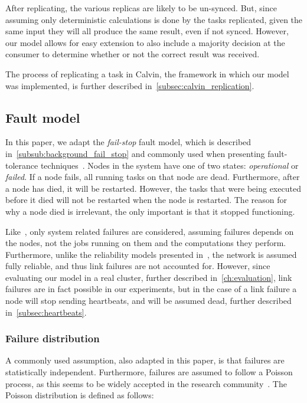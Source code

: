 \documentclass{cslthse-msc}
\begin{document}
After replicating, the various replicas are likely to be un-synced. But, since assuming only deterministic calculations is done by the tasks replicated, given the same input they will all produce the same result, even if not synced. However, our model allows for easy extension to also include a majority decision at the consumer to determine whether or not the correct result was received. %

The process of replicating a task in Calvin, the framework in which our model was implemented, is further described in~\cref{subsec:calvin_replication}.

\subsection{Fault model} \label{subsec:design_fault_model}
In this paper, we adapt the \emph{fail-stop} fault model, which is described in~\cref{subsub:background_fail_stop} and commonly used when presenting fault-tolerance techniques~\cite{surveyFaultParallel}. Nodes in the system have one of two states: \emph{operational} or \emph{failed}. If a node fails, all running tasks on that node are dead. Furthermore, after a node has died, it will be restarted. However, the tasks that were being executed before it died will not be restarted when the node is restarted. The reason for why a node died is irrelevant, the only important is that it stopped functioning.

Like~\cite{selfAdaptRel}, only system related failures are considered, assuming failures depends on the nodes, not the jobs running on them and the computations they perform. Furthermore, unlike the reliability models presented in~\cite{taskSchedulingReplication, taskAllocationSwarm, relAnalysisFRA}, the network is assumed fully reliable, and thus link failures are not accounted for. However, since evaluating our model in a real cluster, further described in~\cref{ch:evaluation}, link failures are in fact possible in our experiments, but in the case of a link failure a node will stop sending heartbeats, and will be assumed dead, further described in~\cref{subsec:heartbeats}.

\subsubsection{Failure distribution} \label{design:failure_distribution}
A commonly used assumption, also adapted in this paper, is that failures are statistically independent. Furthermore, failures are assumed to follow a Poisson process, as this seems to be widely accepted in the research community~\cite{experimentalFailureAssessment}. The Poisson distribution is defined as follows:
\end{document}
